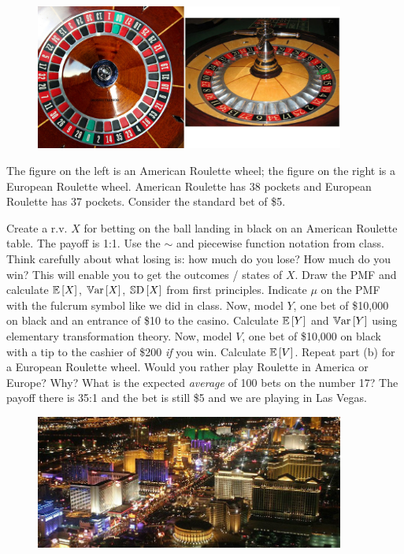 \documentclass[12pt]{article}
\begin{document}
\begin{figure}[htp]
\centering
\includegraphics[width=4in, height=1.88in]{roulette.jpg}
\end{figure}
\FloatBarrier

\noindent The figure on the left is an American Roulette wheel; the figure on the right is a European Roulette wheel. American Roulette has 38 pockets and European Roulette has 37 pockets. Consider the standard bet of \$5.
\begin{enumerate}
\easysubproblem Create a r.v. $X$ for betting on the ball landing in black on an American Roulette table. The payoff is 1:1. Use the $\sim$ and piecewise function notation from class. Think carefully about what losing is: how much do you lose? How much do you win? This will enable you to get the outcomes / states of $X$.
\easysubproblem Draw the PMF and calculate $\mathbb{E}\left[X\right]$, $\mathbb{V}\text{ar}\left[X\right]$, $\mathbb{S}\text{D}\left[X\right]$ from first principles. Indicate $\mu$ on the PMF with the fulcrum symbol like we did in class.
\easysubproblem Now, model $Y$, one bet of \$10,000 on black and an entrance of \$10 to the casino. Calculate $\mathbb{E}\left[Y\right]$ and $\mathbb{V}\text{ar}\left[Y\right]$ using elementary transformation theory.
\intermediatesubproblem Now, model $V$, one bet of \$10,000 on black with a tip to the cashier of \$200 \textit{if} you win. Calculate $\mathbb{E}\left[V\right]$.
\easysubproblem Repeat part (b) for a European Roulette wheel. 
\easysubproblem Would you rather play Roulette in America or Europe? Why?
\hardsubproblem What is the expected \textit{average} of 100 bets on the number 17? The payoff there is 35:1 and the bet is still \$5 and we are playing in Las Vegas.
\end{enumerate}

\begin{figure}[htp]
\centering
\includegraphics[width=4in, height=1.73in]{vegas.jpg}
\end{figure}
\FloatBarrier
\end{document}
